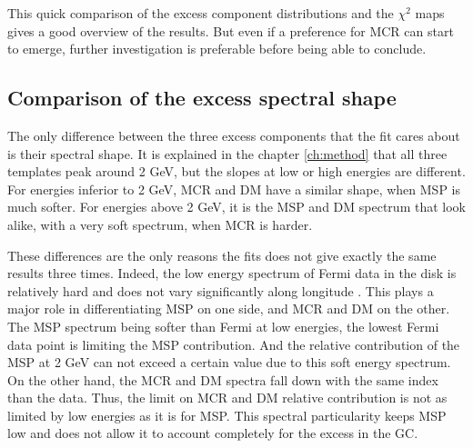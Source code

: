 This quick comparison of the excess component distributions and the $\chi^2$ maps gives a good overview of the results. But even if a preference for MCR can start to emerge, further investigation is preferable before being able to conclude.


\subsection{Comparison of the excess spectral shape}

The only difference between the three excess components that the fit cares about is their spectral shape. It is explained in the chapter \ref{ch:method} that all three templates peak around 2 GeV, but the slopes at low or high energies are different. For energies inferior to 2 GeV, MCR and DM have a similar shape, when MSP is much softer. For energies above 2 GeV, it is the MSP and DM spectrum that look alike, with a very soft spectrum, when MCR is harder.

These differences are the only reasons the fits does not give exactly the same results three times.
Indeed, the low energy spectrum of Fermi data in the disk is relatively hard and does not vary significantly along longitude . This plays a major role in differentiating MSP on one side, and MCR and DM on the other. The MSP spectrum being softer than Fermi at low energies, the lowest Fermi data point is limiting the MSP contribution. And the relative contribution of the MSP at 2 GeV can not exceed a certain value due to this soft energy spectrum. On the other hand, the MCR and DM spectra fall down with the same index than the data. Thus, the limit on MCR and DM relative contribution is not as limited by low energies as it is for MSP.
This spectral particularity keeps MSP low and does not allow it to account completely for the excess in the GC.


